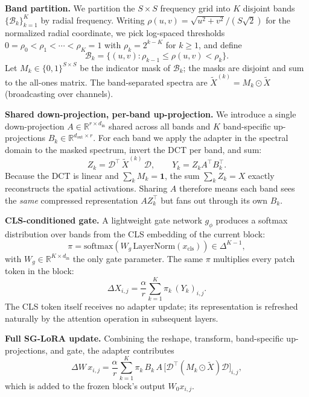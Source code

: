 \documentclass{article}
\begin{document}
\textbf{Band partition.} We partition the $S \times S$ frequency grid into $K$ disjoint bands $\{\mathcal{B}_k\}_{k=1}^K$ by radial frequency. Writing $\rho(u,v) = \sqrt{u^2 + v^2}/(S\sqrt{2})$ for the normalized radial coordinate, we pick log-spaced thresholds $0 = \rho_0 < \rho_1 < \cdots < \rho_K = 1$ with $\rho_k = 2^{k-K}$ for $k \geq 1$, and define
\begin{equation}
\mathcal{B}_k = \{(u,v) : \rho_{k-1} \leq \rho(u,v) < \rho_k\}.
\end{equation}
Let $M_k \in \{0,1\}^{S \times S}$ be the indicator mask of $\mathcal{B}_k$; the masks are disjoint and sum to the all-ones matrix. The band-separated spectra are $\tilde{X}^{(k)} = M_k \odot \tilde{X}$ (broadcasting over channels).

\textbf{Shared down-projection, per-band up-projection.} We introduce a single down-projection $A \in \mathbb{R}^{r \times d_{\text{in}}}$ shared across all bands and $K$ band-specific up-projections $B_k \in \mathbb{R}^{d_{\text{out}} \times r}$. For each band we apply the adapter in the spectral domain to the masked spectrum, invert the DCT per band, and sum:
\begin{equation}
Z_k = \mathcal{D}^\top\, \tilde{X}^{(k)}\, \mathcal{D}, \qquad Y_k = Z_k A^\top B_k^\top.
\end{equation}
Because the DCT is linear and $\sum_k M_k = \mathbf{1}$, the sum $\sum_k Z_k = X$ exactly reconstructs the spatial activations. Sharing $A$ therefore means each band sees the \emph{same} compressed representation $A Z_k^\top$ but fans out through its own $B_k$.

\textbf{CLS-conditioned gate.} A lightweight gate network $g_\phi$ produces a softmax distribution over bands from the CLS embedding of the current block:
\begin{equation}
\pi = \mathrm{softmax}\!\left( W_g\, \mathrm{LayerNorm}(x_{\text{cls}}) \right) \in \Delta^{K-1},
\end{equation}
with $W_g \in \mathbb{R}^{K \times d_{\text{in}}}$ the only gate parameter. The same $\pi$ multiplies every patch token in the block:
\begin{equation}
\Delta X_{i,j} = \frac{\alpha}{r} \sum_{k=1}^{K} \pi_k\, (Y_k)_{i,j}.
\end{equation}
The CLS token itself receives no adapter update; its representation is refreshed naturally by the attention operation in subsequent layers.

\textbf{Full SG-LoRA update.} Combining the reshape, transform, band-specific up-projections, and gate, the adapter contributes
\begin{equation}
\Delta W\, x_{i,j} = \frac{\alpha}{r} \sum_{k=1}^{K} \pi_k\, B_k\, A\, \big[\mathcal{D}^\top (M_k \odot \tilde{X}) \mathcal{D}\big]_{i,j},
\end{equation}
which is added to the frozen block's output $W_0 x_{i,j}$.
\end{document}
